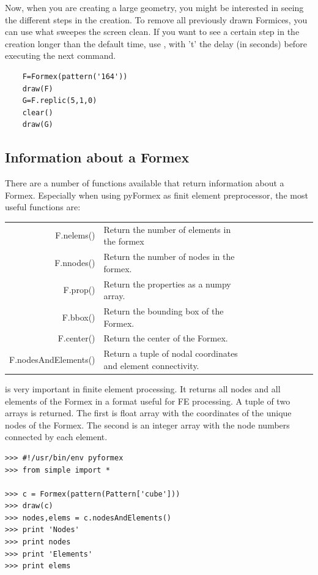\documentclass[a4paper]{manual}
\newcommand{\pyformex}{pyFormex\xspace}
\begin{document}
{Now, when you are creating a large geometry, you might be interested in seeing the different steps in the creation. To remove all previously drawn Formices, you can use   what sweepes the screen clean. If you want to see a certain step in the creation longer than the default time, use , with 't' the delay (in seconds) before executing the next command.
\begin{verbatim}
	F=Formex(pattern('164'))
	draw(F)
	G=F.replic(5,1,0)
	clear()
	draw(G)
\end{verbatim}


\subsection{Information about a Formex}
\label{subsec:info}
There are a number of functions available that return information about a Formex. Especially when using \pyformex as finit element preprocessor, the most useful functions are:
\begin{table}[h]
	\begin{tabular}{*{5}{rl}}
F.nelems()				& Return the number of elements in the formex\\
F.nnodes() 			& Return the number of nodes in the formex.\\
F.prop() 				& Return the properties as a numpy array.\\
F.bbox()				& Return the bounding box of the Formex.\\
F.center()				& Return the center of the Formex.\\
F.nodesAndElements() 	& Return a tuple of nodal coordinates and element connectivity.\\
	\end {tabular}
\end{table}

 is very important in finite element processing. It returns all nodes and all elements of the Formex in a format useful for FE processing. A tuple of two arrays is returned. The first is float array with the coordinates of the unique nodes of the Formex. The second is an integer array with the node numbers connected by each element.
\begin{verbatim}
>>> #!/usr/bin/env pyformex
>>> from simple import *

>>> c = Formex(pattern(Pattern['cube']))
>>> draw(c)
>>> nodes,elems = c.nodesAndElements()
>>> print 'Nodes'
>>> print nodes
>>> print 'Elements'
>>> print elems


\end{verbatim}}
\end{document}
